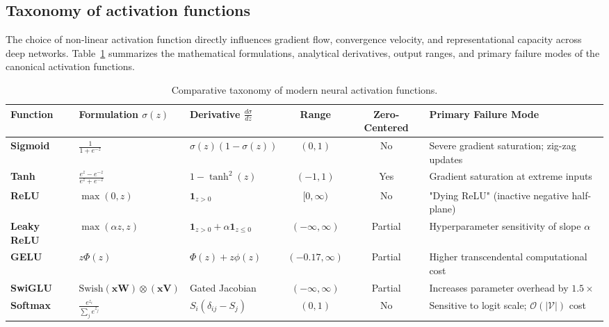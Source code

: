 \documentclass[../../main.tex]{subfiles}
\begin{document}
\subsection{Taxonomy of activation functions}
\label{subsec:activation_taxonomy}

The choice of non-linear activation function directly influences gradient flow, convergence velocity, and representational capacity across deep networks. Table~\ref{tab:activation_comparison} summarizes the mathematical formulations, analytical derivatives, output ranges, and primary failure modes of the canonical activation functions.

\begin{table}[htbp]
\centering
\small
\renewcommand{\arraystretch}{1.3}
\caption{Comparative taxonomy of modern neural activation functions.}
\label{tab:activation_comparison}
\begin{tabularx}{\textwidth}{l l l c c X}
\toprule
\textbf{Function} & \textbf{Formulation $\sigma(z)$} & \textbf{Derivative $\frac{d\sigma}{dz}$} & \textbf{Range} & \textbf{Zero-Centered} & \textbf{Primary Failure Mode} \\
\midrule
\textbf{Sigmoid} & $\frac{1}{1 + e^{-z}}$ & $\sigma(z)(1 - \sigma(z))$ & $(0, 1)$ & No & Severe gradient saturation; zig-zag updates \\
\textbf{Tanh} & $\frac{e^z - e^{-z}}{e^z + e^{-z}}$ & $1 - \tanh^2(z)$ & $(-1, 1)$ & Yes & Gradient saturation at extreme inputs \\
\textbf{ReLU} & $\max(0, z)$ & $\mathbf{1}_{z > 0}$ & $[0, \infty)$ & No & "Dying ReLU" (inactive negative half-plane) \\
\textbf{Leaky ReLU} & $\max(\alpha z, z)$ & $\mathbf{1}_{z > 0} + \alpha \mathbf{1}_{z \le 0}$ & $(-\infty, \infty)$ & Partial & Hyperparameter sensitivity of slope $\alpha$ \\
\textbf{GELU} & $z \Phi(z)$ & $\Phi(z) + z \phi(z)$ & $(-0.17, \infty)$ & Partial & Higher transcendental computational cost \\
\textbf{SwiGLU} & $\text{Swish}(\mathbf{x}\mathbf{W}) \otimes (\mathbf{x}\mathbf{V})$ & Gated Jacobian & $(-\infty, \infty)$ & Partial & Increases parameter overhead by $1.5\times$ \\
\textbf{Softmax} & $\frac{e^{z_i}}{\sum_j e^{z_j}}$ & $S_i(\delta_{ij} - S_j)$ & $(0, 1)$ & No & Sensitive to logit scale; $\mathcal{O}(|\mathcal{V}|)$ cost \\
\bottomrule
\end{tabularx}
\end{table}
\end{document}
